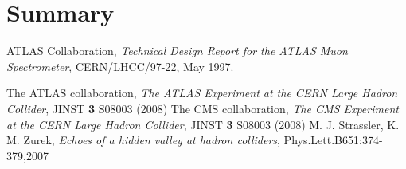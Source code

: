 \documentclass{JINST}
\begin{document}
%
\section{Summary}
%



\begin{thebibliography}{9}

ATLAS Collaboration,
\textsl{Technical Design Report for the ATLAS Muon Spectrometer},
CERN/LHCC/97-22, May 1997.


The ATLAS collaboration,
\emph{The ATLAS Experiment at the CERN Large Hadron Collider},
JINST {\textbf 3}  S08003 (2008)
%
The CMS collaboration,
\emph{The CMS Experiment at the CERN Large Hadron Collider},
JINST {\textbf 3}  S08003 (2008)
%
M. J. Strassler, K. M. Zurek, 
\emph{Echoes of a hidden valley at hadron colliders},
Phys.Lett.B651:374-379,2007 

\end{thebibliography}
\end{document}
